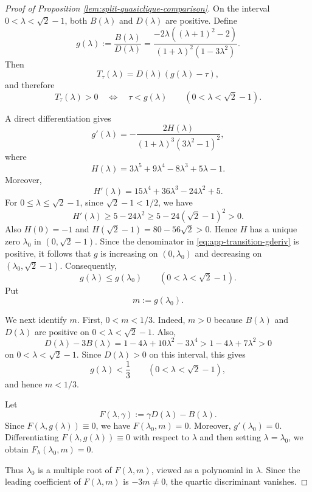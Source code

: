\documentclass[10pt,a4paper]{article}
\begin{document}
\begin{proof}[Proof of Proposition \ref{lem:split-quasiclique-comparison}]
On the interval \(0<\lambda<\sqrt{2}-1\), both \(B(\lambda)\) and
\(D(\lambda)\) are positive. Define
\begin{equation}\label{eq:app-transition-gdef}
g(\lambda):=\frac{B(\lambda)}{D(\lambda)}
=
\frac{-2\lambda((\lambda+1)^2-2)}
{(1+\lambda)^2(1-3\lambda^2)}.
\end{equation}
Then
\[
T_\tau(\lambda)=D(\lambda)(g(\lambda)-\tau),
\]
and therefore
\begin{equation}\label{eq:app-transition-Tsign}
T_\tau(\lambda)>0
\quad\Longleftrightarrow\quad
\tau<g(\lambda)
\qquad
(0<\lambda<\sqrt{2}-1).
\end{equation}


A direct differentiation gives
\begin{equation}\label{eq:app-transition-gderiv}
g'(\lambda)
=
-\frac{2H(\lambda)}
{(1+\lambda)^3(3\lambda^2-1)^2},
\end{equation}
where
\[
H(\lambda)=3\lambda^5+9\lambda^4-8\lambda^3+5\lambda-1.
\]
Moreover,
\[
H'(\lambda)=15\lambda^4+36\lambda^3-24\lambda^2+5.
\]
For \(0\le\lambda\le\sqrt{2}-1\), since \(\sqrt{2}-1<1/2\), we have
\[
H'(\lambda)\ge 5-24\lambda^2
\ge 5-24(\sqrt{2}-1)^2>0.
\]
Also
$H(0)=-1$ and
$H(\sqrt{2}-1)=80-56\sqrt{2}>0.$ 
Hence \(H\) has a unique zero \(\lambda_0\) in
\((0,\sqrt{2}-1)\). Since the denominator in
\eqref{eq:app-transition-gderiv} is positive, it follows that \(g\) is
increasing on \((0,\lambda_0)\) and decreasing on
\((\lambda_0,\sqrt{2}-1)\). Consequently,
\begin{equation}\label{eq:app-transition-gmax}
g(\lambda)\le g(\lambda_0)
\qquad
(0<\lambda<\sqrt{2}-1).
\end{equation}
Put
\[
m:=g(\lambda_0).
\]


We next identify \(m\). First, \(0<m<1/3\). Indeed, \(m>0\) because
\(B(\lambda)\) and \(D(\lambda)\) are positive on
\(0<\lambda<\sqrt{2}-1\). Also,
\[
D(\lambda)-3B(\lambda)
=
1-4\lambda+10\lambda^2-3\lambda^4
>
1-4\lambda+7\lambda^2>0
\]
on \(0<\lambda<\sqrt{2}-1\). Since \(D(\lambda)>0\) on this interval, this
gives
\[
g(\lambda)<\frac13
\qquad
(0<\lambda<\sqrt{2}-1),
\]
and hence \(m<1/3\).


Let
\[
F(\lambda,\gamma):=\gamma D(\lambda)-B(\lambda).
\]
Since \(F(\lambda,g(\lambda))\equiv0\), we have
$F(\lambda_0,m)=0$. 
Moreover, \(g'(\lambda_0)=0\). Differentiating
\(F(\lambda,g(\lambda))\equiv0\) with respect to \(\lambda\) and then
setting \(\lambda=\lambda_0\), we obtain
$F_\lambda(\lambda_0,m)=0$.

Thus \(\lambda_0\) is a multiple root of \(F(\lambda,m)\), viewed as a
polynomial in \(\lambda\). Since the leading coefficient of \(F(\lambda,m)\)
is \(-3m\ne0\), the quartic discriminant vanishes.



\end{proof}
\end{document}
